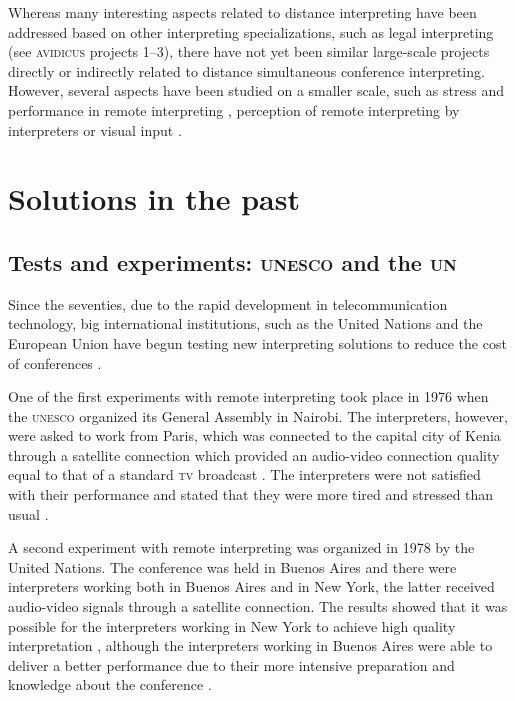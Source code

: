 \documentclass[output=paper]{langsci/langscibook}
\begin{document}
Whereas many interesting aspects related to distance interpreting have been addressed based on other interpreting specializations, such as legal interpreting (see \textsc{avidicus} projects 1--3), there have not yet been similar large-scale projects directly or indirectly related to distance simultaneous conference interpreting. However, several aspects have been studied on a smaller scale, such as stress and performance in remote interpreting \citep{Moser-Mercer2003,Roziner2010}, perception of remote interpreting by interpreters \citep{Mouzourakis2006} or visual input \citep{Rennert2008,Luisetto2016}.

\section{Solutions in the past}
\label{sec:ziegler:03}
\subsection{Tests and experiments: \textsc{unesco} and the \textsc{un}}
\label{sub:ziegler:3.1}
Since the seventies, due to the rapid development in telecommunication technology, big international institutions, such as the United Nations and the European Union have begun testing new interpreting solutions to reduce the cost of conferences \citep[26]{UNESCO1987}.

One of the first experiments with remote interpreting took place in 1976 when the \textsc{unesco} organized its General Assembly in Nairobi. The interpreters, however, were asked to work from Paris, which was connected to the capital city of Kenia through a satellite connection which provided an audio-video connection quality equal to that of a standard \textsc{tv} broadcast \citep[30]{Mouzourakis1996}. The interpreters were not satisfied with their performance and stated that they were more tired and stressed than usual \citep[294]{Kurz2000}.

A second experiment with remote interpreting was organized in 1978 by the United Nations. The conference was held in Buenos Aires and there were interpreters working both in Buenos Aires and in New York, the latter received audio-video signals through a satellite connection. The results showed that it was possible for the interpreters working in New York to achieve high quality interpretation \citep[26]{UNESCO1987}, although the interpreters working in Buenos Aires were able to deliver a better performance due to their more intensive preparation and knowledge about the conference \citep[82--90]{Chernov2004}. 
\end{document}
